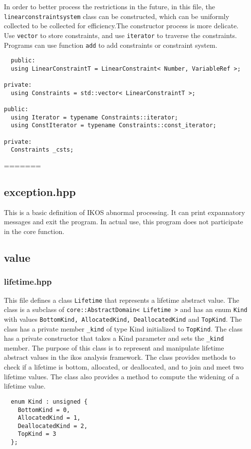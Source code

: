 \documentclass[12pt]{article}
\begin{document}
In order to better process the restrictions in the future, in this file, the \texttt {linearconstraintsystem} class can be constructed, which can be uniformly collected to be collected for efficiency.The constructor process is more delicate. Use \texttt {vector} to store constraints, and use \texttt {iterator} to traverse the constraints. Programs can use function \texttt{add} to add constraints or constraint system.

\begin{lstlisting}
  public:
  using LinearConstraintT = LinearConstraint< Number, VariableRef >;

private:
  using Constraints = std::vector< LinearConstraintT >;

public:
  using Iterator = typename Constraints::iterator;
  using ConstIterator = typename Constraints::const_iterator;

private:
  Constraints _csts;
\end{lstlisting}

=======

\subsection{exception.hpp}

This is a basic definition of IKOS abnormal processing. It can print expannatory messages and exit the program. In actual use, this program does not participate in the core function.

\subsection{value}
\subsubsection{lifetime.hpp}
This file defines a class \texttt{Lifetime} that represents a lifetime abstract value. The class is a subclass of \texttt{core::AbstractDomain< Lifetime >} and has an enum \texttt{Kind} with values \texttt{BottomKind, AllocatedKind, DeallocatedKind} and \texttt{TopKind}. The class has a private member \texttt{\_kind} of type Kind initialized to \texttt{TopKind}. The class has a private constructor that takes a Kind parameter and sets the \texttt{\_kind} member. The purpose of this class is to represent and manipulate lifetime abstract values in the ikos analysis framework. The class provides methods to check if a lifetime is bottom, allocated, or deallocated, and to join and meet two lifetime values. The class also provides a method to compute the widening of a lifetime value.
\begin{lstlisting}
  enum Kind : unsigned {
    BottomKind = 0,
    AllocatedKind = 1,
    DeallocatedKind = 2,
    TopKind = 3
  };
\end{lstlisting}
\end{document}
